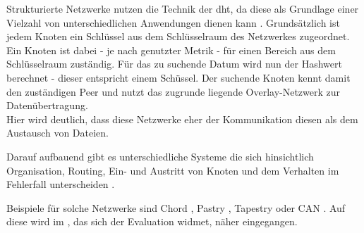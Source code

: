 Strukturierte Netzwerke nutzen die Technik der \ac{dht}, da diese als Grundlage einer Vielzahl von unterschiedlichen Anwendungen dienen kann \cite{Wehrle2005, Ghodsi2006AlgorithmsDHT}. Grundsätzlich ist jedem Knoten ein Schlüssel aus dem Schlüsselraum des Netzwerkes zugeordnet. Ein Knoten ist dabei - je nach genutzter Metrik - für einen Bereich aus dem Schlüsselraum zuständig. Für das zu suchende Datum wird nun der Hashwert berechnet - dieser entspricht einem Schüssel. Der suchende Knoten kennt damit den zuständigen Peer und nutzt das zugrunde liegende Overlay-Netzwerk zur Datenübertragung.\\
Hier wird deutlich, dass diese Netzwerke eher der Kommunikation diesen als dem Austausch von Dateien.

Darauf aufbauend gibt es unterschiedliche Systeme die sich hinsichtlich Organisation, Routing, Ein- und Austritt von Knoten und dem Verhalten im Fehlerfall unterscheiden \cite{Goetz2005, Lua2005Survey}.

Beispiele für solche Netzwerke sind Chord \cite{Hosseini2007Survey}, Pastry \cite{Rowstron2001}, Tapestry \cite{Zhao2001Tapestry,Zhao2004Tapestry} oder CAN \cite{Ratnasamy2001Scalable}. Auf diese wird im , das sich der Evaluation widmet, näher eingegangen.
